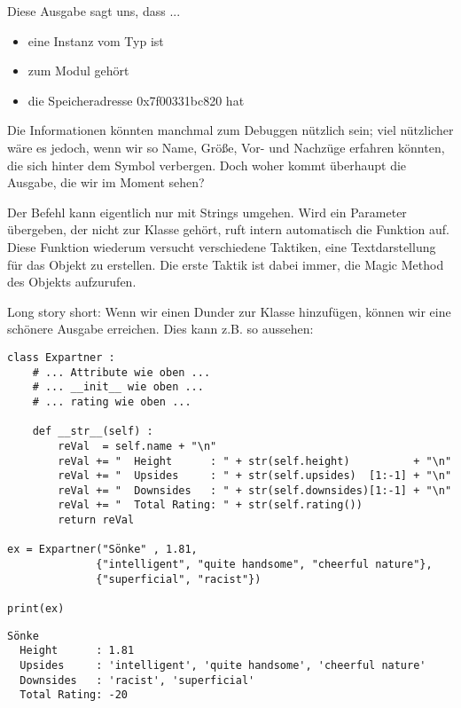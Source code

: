 Diese Ausgabe sagt uns, dass  ...
\begin{itemize}
\item eine Instanz vom Typ  ist
\item zum Modul  gehört
\item die Speicheradresse 0x7f00331bc820 hat
\end{itemize}
Die Informationen könnten manchmal zum Debuggen nützlich sein; viel nützlicher wäre es jedoch, wenn wir so Name, Größe, Vor- und Nachzüge erfahren könnten, die sich hinter dem Symbol  verbergen. Doch woher kommt überhaupt die Ausgabe, die wir im Moment sehen?

Der Befehl  kann eigentlich nur mit Strings umgehen. Wird ein Parameter übergeben, der nicht zur Klasse  gehört, ruft  intern automatisch die Funktion  auf. Diese Funktion wiederum versucht verschiedene Taktiken, eine Textdarstellung für das Objekt zu erstellen. Die erste Taktik ist dabei immer, die Magic Method  des Objekts aufzurufen.

Long story short: Wenn wir einen Dunder  zur Klasse hinzufügen, können wir eine schönere Ausgabe erreichen. Dies kann z.B. so aussehen:

\begin{codebox}
\begin{verbatim}
class Expartner :
    # ... Attribute wie oben ...
    # ... __init__ wie oben ...
    # ... rating wie oben ...
    
    def __str__(self) :
        reVal  = self.name + "\n"
        reVal += "  Height      : " + str(self.height)          + "\n"
        reVal += "  Upsides     : " + str(self.upsides)  [1:-1] + "\n"
        reVal += "  Downsides   : " + str(self.downsides)[1:-1] + "\n"
        reVal += "  Total Rating: " + str(self.rating())
        return reVal
        
ex = Expartner("Sönke" , 1.81, 
              {"intelligent", "quite handsome", "cheerful nature"},
              {"superficial", "racist"})

print(ex)
\end{verbatim}
\end{codebox}
\begin{cmdbox}
\begin{verbatim}
Sönke
  Height      : 1.81
  Upsides     : 'intelligent', 'quite handsome', 'cheerful nature'
  Downsides   : 'racist', 'superficial'
  Total Rating: -20
\end{verbatim}
\end{cmdbox}

